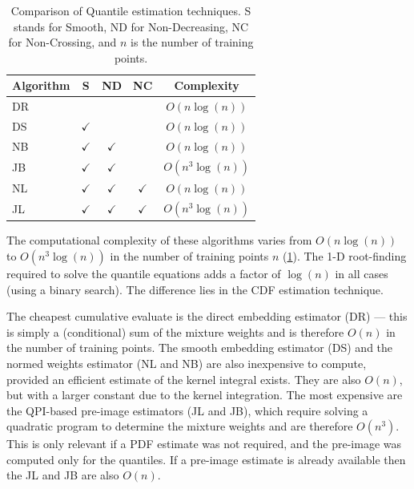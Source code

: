 \documentclass[twoside]{article} \usepackage{aistats2017}
\theoremstyle{definition}
\theoremstyle{theorem}
\newcommand{\qpi}{QPI}
\begin{document}
	\begin{table}[t!]
% 
% 
		\begin{center}
			\begin{tabular}{l|cccc}
				Algorithm & S & ND &   NC & Complexity \\ \hline
				DR  &              &                &                & $O(n \log(n))$    \\
				DS  & $\checkmark$ &                &                &
				$O(n \log(n))$  \\
				NB  & $\checkmark$ & $\checkmark$   &                &
				$O(n \log(n))$ \\
				JB  & $\checkmark$ & $\checkmark$   &                &
				$O(n^{3} \log(n))$ \\
				NL  & $\checkmark$ & $\checkmark$   & $\checkmark$   &
				$O(n \log(n))$ \\
				JL  & $\checkmark$ & $\checkmark$   & $\checkmark$   &   $O(n^{3} \log(n))$ 
			\end{tabular}
		\end{center}
		\caption{\small Comparison of Quantile estimation techniques. S stands for Smooth, ND for Non-Decreasing, NC for Non-Crossing, and $n$ is the number of training points.}
		\label{table:quantile_regression_methods}
	\end{table}
	
		
	The computational complexity of these algorithms varies from $O(n \log(n))$ to $O(n^{3} \log(n))$ in the number of training points $n$ (\cref{table:quantile_regression_methods}). The 1-D root-finding required to solve the quantile equations adds a factor of $\log(n)$ in all cases (using a binary search). The difference lies in the CDF estimation technique.
	
	The cheapest cumulative evaluate is the direct embedding estimator (DR) --- this is simply a (conditional) sum of the mixture weights and is therefore $O(n)$ in the number of training points. The smooth embedding estimator (DS) and the normed weights estimator (NL and NB) are also inexpensive to compute, provided an efficient estimate of the kernel integral exists. They are also $O(n)$, but with a larger constant due to the kernel integration. The most expensive are the \qpi\space-based pre-image estimators (JL and JB), which require solving a quadratic program to determine the mixture weights and are therefore $O(n^3)$. This is only relevant if a PDF estimate was not required, and the pre-image was computed only for the quantiles. If a pre-image estimate is already available then the JL and JB are also $O(n)$.
	
\end{document}

